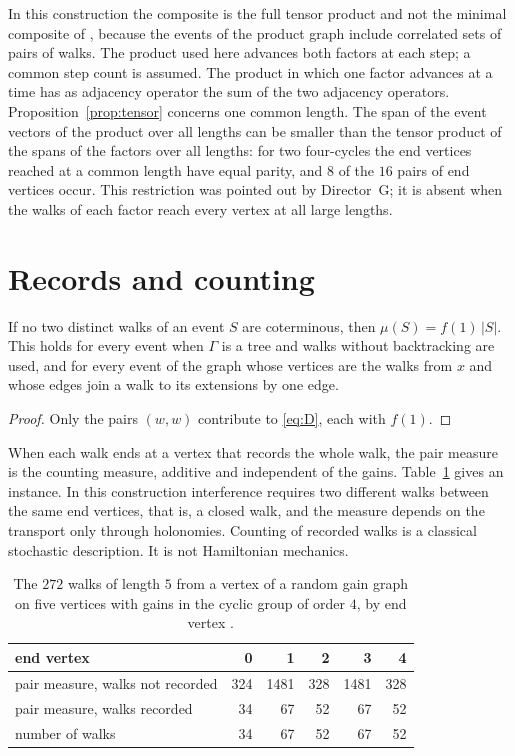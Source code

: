 In this construction the composite is the full tensor product and not the minimal composite of \cite{g7}, because the events of the product graph include correlated sets of pairs of walks. The product used here advances both factors at each step; a common step count is assumed. The product in which one factor advances at a time has as adjacency operator the sum of the two adjacency operators. Proposition~\ref{prop:tensor} concerns one common length. The span of the event vectors of the product over all lengths can be smaller than the tensor product of the spans of the factors over all lengths: for two four-cycles the end vertices reached at a common length have equal parity, and $8$ of the $16$ pairs of end vertices occur. This restriction was pointed out by Director~G; it is absent when the walks of each factor reach every vertex at all large lengths.

\section{Records and counting}

\begin{proposition}\label{prop:records}
If no two distinct walks of an event $S$ are coterminous, then $\mu(S)=f(1)\,|S|$. This holds for every event when $\Gamma$ is a tree and walks without backtracking are used, and for every event of the graph whose vertices are the walks from $x$ and whose edges join a walk to its extensions by one edge.
\end{proposition}
\begin{proof}
Only the pairs $(w,w)$ contribute to \eqref{eq:D}, each with $f(1)$.
\end{proof}

When each walk ends at a vertex that records the whole walk, the pair measure is the counting measure, additive and independent of the gains. Table~\ref{tab:records} gives an instance. In this construction interference requires two different walks between the same end vertices, that is, a closed walk, and the measure depends on the transport only through holonomies. Counting of recorded walks is a classical stochastic description. It is not Hamiltonian mechanics.

\begin{table}[ht]\centering\small
\begin{tabular}{@{}lrrrrr@{}}\toprule
end vertex & 0 & 1 & 2 & 3 & 4\\\midrule
pair measure, walks not recorded & 324 & 1481 & 328 & 1481 & 328\\
pair measure, walks recorded & 34 & 67 & 52 & 67 & 52\\
number of walks & 34 & 67 & 52 & 67 & 52\\\bottomrule
\end{tabular}
\caption{The $272$ walks of length $5$ from a vertex of a random gain graph on five vertices with gains in the cyclic group of order $4$, by end vertex \cite{comp2}.}\label{tab:records}
\end{table}

